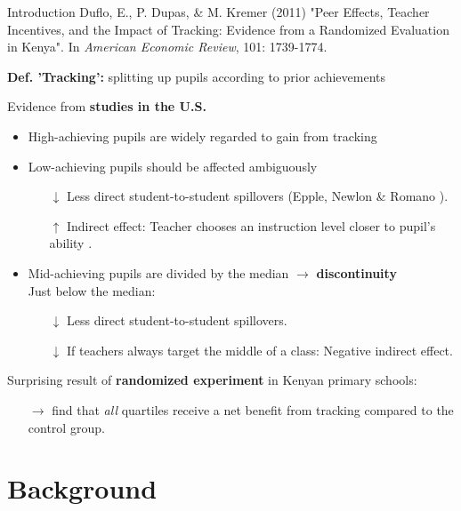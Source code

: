 \documentclass[9pt]{beamer}
\newcommand{\comment}[1]{}  %
\numberwithin{equation}{section}
\begin{document}
\begin{frame}{Introduction}
  Duflo, E., P. Dupas, \& M. Kremer (2011) "Peer Effects, Teacher Incentives, and the Impact of Tracking: Evidence from a Randomized Evaluation in Kenya". In \textit{American Economic Review}, 101: 1739-1774.

  \textbf{Def. 'Tracking':} splitting up pupils according to prior achievements

  Evidence from \textbf{studies in the U.S.}
  \begin{itemize}
    \item High-achieving pupils are widely regarded to gain from tracking
    \item Low-achieving pupils should be affected ambiguously
    \begin{itemize}
      \item[$\downarrow$] Less direct student-to-student spillovers (Epple, Newlon \& Romano \citeyear{epple2002ability}).
      \comment{Which Epple, Newlon and Romano find to dominate in the US.}
      \item[$\uparrow$] Indirect effect: Teacher chooses an instruction level closer to pupil's ability \citep{figlio2002school, zimmer2003new, lefgren2004educational}.
      \comment{Figlio and Lefgren find the two effects to cancel out, Zimmer finds the indirect effect to dominate.}
    \end{itemize}
    \item Mid-achieving pupils are divided by the median $\rightarrow$ \textbf{discontinuity}\\
    Just below the median:
    \begin{itemize}
      \item[$\downarrow$] Less direct student-to-student spillovers.
      \item[$\downarrow$] If teachers always target the middle of a class: Negative indirect effect.
    \end{itemize}
  \end{itemize}
Surprising result of \textbf{randomized experiment} in Kenyan primary schools:
\begin{itemize}
  \item[$\rightarrow$] \citet{duflo2011peer} find that \textit{all} quartiles receive a net benefit from tracking compared to the control group.
\end{itemize}
\end{frame}

\section{Background}
\end{document}
